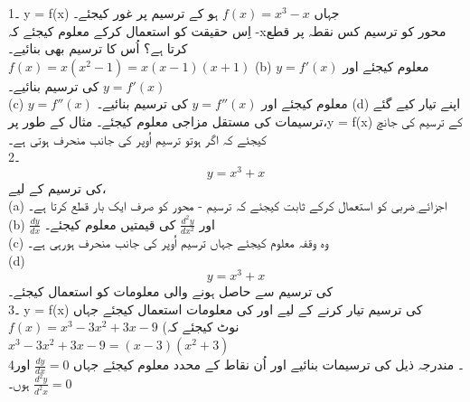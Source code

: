 1۔  y = f(x) جہاں
\( f(x)=x^3-x\)
 ہو کے ترسیم پر غور کیجئے۔\\
  اِس حقیقت کو استعمال کرکے معلوم کیجئے کہ -xمحور کو ترسیم کس نقطہ پر قطع کرتا ہے؟  اُس کا ترسیم بھی بنائیے۔ \\
 	  \(f(x)=x(x^2-1)=x(x-1)(x+1)\)
	(b)   \(y=f'(x)\)  معلوم کیجئے اور  \(y=f'(x)\) کی ترسیم بنائیے۔ \\
	(c)  \(y=f''(x)\) معلوم کیجئے اور  \(y=f''(x)\)  کی ترسیم بنائیے۔
	(d) اپنے تیار کیے گئے ترسیمات کی مستقل مزاجی  معلوم کیجئے۔ مثال کے طور پر،y = f(x) کے ترسیم کی جانچ کیجئے کہ اگر    ہوتو ترسیم اُوپر کی جانب منحرف ہوتی ہے۔ \\
2۔ 
\[y=x^{3}+x\]
 کی ترسیم کے لیے،\\
	(a) اجزائے ٖضربی  کو استعمال کرکے ثابت کیجئے کہ ترسیم -
	محور کو صرف ایک بار قطع کرتا ہے۔ \\
	(b)   \(\frac{dy}{dx}\)
	 اور  
	 \(\frac{d^{2}y}{dx^{2}}\)
	  کی قیمتیں معلوم کیجئے۔ \\
	(c) وہ وقفہ معلوم کیجئے جہاں ترسیم اُوپر کی جانب منحرف ہورہی ہے۔\\
	(d) \[y=x^{3}+x\]
	 کی ترسیم سے حاصل ہونے والی معلومات کو استعمال کیجئے۔ \\
3۔ y = f(x)  کی ترسیم تیار کرنے کے لیے  اور   کی معلومات استعمال کیجئے جہاں\\
\(f(x)=x^{3}-3x^{2}+3x-9\)
(نوٹ کیجئے کہ
  \(x^3-3x^2+3x-9=(x-3)(x^2+3)\)\\
4۔ مندرجہ ذیل کی ترسیمات بنائیے اور اُن نقاط کے محدد معلوم کیجئے جہاں
 \(\frac{dy}{dx}=0\)
  اور 
  \(\frac{d^2y}{d^2x}=0\)
   ہوں۔\\
    
